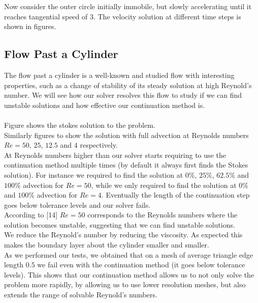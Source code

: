 \documentclass[11pt,twoside,a4paper]{article}
\begin{document}
Now consider the outer circle initially immobile, but slowly accelerating until it reaches tangential speed of $3$. The velocity solution at different time steps is shown in figures.

\subsection{Flow Past a Cylinder}

The flow past a cylinder is a well-known and studied flow with interesting properties, such as a change of stability of its steady solution at high Reynold's number.
We will see how our solver resolves this flow to study if we can find unstable solutions and how effective our continuation method is.\\
\\
Figure shows the stokes solution to the problem.\\
Similarly figures to show the solution with full advection at Reynolds numbers $Re = 50$, $25$, $12.5$ and $4$ respectively.\\
At Reynolds numbers higher than our solver starts requiring to use the continuation method multiple times (by default it always first finds the Stokes solution). For instance we required to find the solution at $0 \%$, $25 \%$, $62.5\%$ and $100\%$ advection for $Re =50$, while we only required to find the solution at $0 \%$ and $100 \%$ advection for $Re = 4 $. Eventually the length of the continuation step goes below tolerance levels and our solver fails.\\
According to [14] $Re = 50$ corresponds to the Reynolds numbers where the solution becomes unstable, suggesting that we can find unstable solutions.\\
We reduce the Reynold's number by reducing the viscosity. As expected this makes the boundary layer about the cylinder smaller and smaller.\\
As we performed our tests, we obtained that on a mesh of average triangle edge length $0.5$ we fail even with the continuation method (it goes below tolerance levels). This shows that our continuation method allows us to not only solve the problem more rapidly, by allowing us to use lower resolution meshes, but also extends the range of solvable Reynold's numbers.
\end{document}
